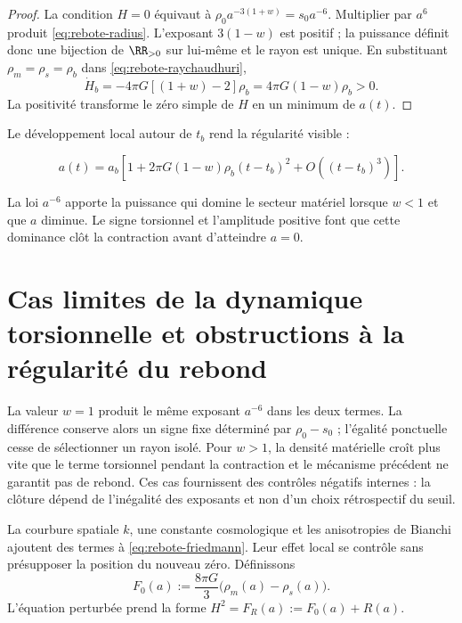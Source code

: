 \begin{proof}
La condition \(H=0\) équivaut à
\(\rho_0a^{-3(1+w)}=s_0a^{-6}\). Multiplier par \(a^6\) produit
\cref{eq:rebote-radius}. L'exposant \(3(1-w)\) est positif ; la
puissance définit donc une bijection de \(\RR_{>0}\) sur lui-même et le rayon est
unique. En substituant \(\rho_m=\rho_s=\rho_b\) dans
\cref{eq:rebote-raychaudhuri},
\[
 \dot H_b=-4\pi G[(1+w)-2]\rho_b
 =4\pi G(1-w)\rho_b>0.
\]
La positivité transforme le zéro simple de \(H\) en un minimum de \(a(t)\).
\end{proof}

Le développement local autour de \(t_b\) rend la régularité visible :

\begin{equation}
 a(t)=a_b\left[
 1+2\pi G(1-w)\rho_b(t-t_b)^2
 +O\!\left((t-t_b)^3\right)
 \right].
 \label{eq:rebote-local-expansion}
\end{equation}

La loi \(a^{-6}\) apporte la puissance qui domine le secteur matériel lorsque
\(w<1\) et que \(a\) diminue. Le signe torsionnel et l'amplitude positive font
que cette dominance clôt la contraction avant d'atteindre \(a=0\).

\section{Cas limites de la dynamique torsionnelle et obstructions à la régularité du rebond}

La valeur \(w=1\) produit le même exposant \(a^{-6}\) dans les deux termes.
La différence conserve alors un signe fixe déterminé par
\(\rho_0-s_0\) ; l'égalité ponctuelle cesse de sélectionner un rayon isolé.
Pour \(w>1\), la densité matérielle croît plus vite que le terme
torsionnel pendant la contraction et le mécanisme précédent ne garantit pas de
rebond. Ces cas fournissent des contrôles négatifs internes : la clôture
dépend de l'inégalité des exposants et non d'un choix rétrospectif
du seuil.

La courbure spatiale \(k\), une constante cosmologique et les anisotropies
de Bianchi ajoutent des termes à \cref{eq:rebote-friedmann}. Leur effet local
se contrôle sans présupposer la position du nouveau zéro. Définissons
\[
 F_0(a):=\frac{8\pi G}{3}\bigl(\rho_m(a)-\rho_s(a)\bigr).
\]
L'équation perturbée prend la forme
\(H^2=F_R(a):=F_0(a)+R(a)\).

